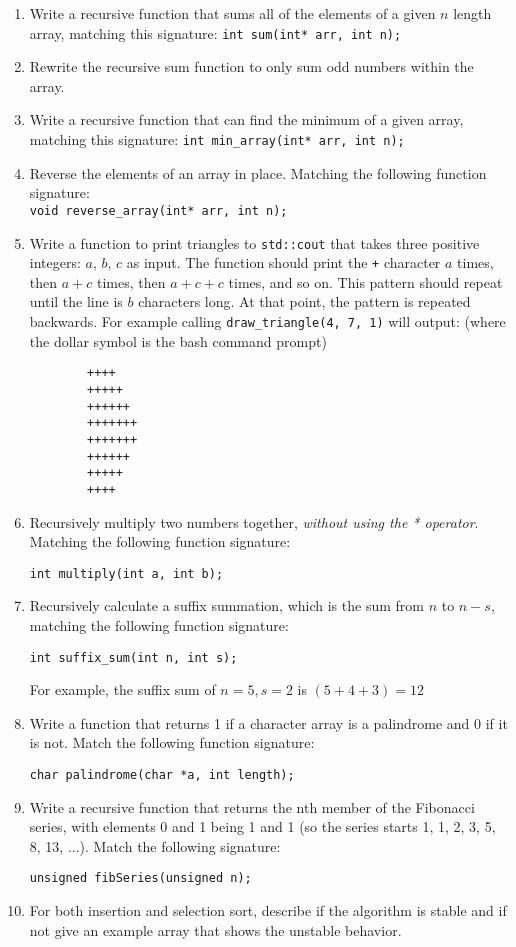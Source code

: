\documentclass[11pt]{article}
\begin{document}
    \begin{enumerate}
        \item Write a recursive function that sums all of the elements of a given $n$ length array, matching this signature: \verb|int sum(int* arr, int n);|
        \item Rewrite the recursive sum function to only sum odd numbers within the array.
        \item Write a recursive function that can find the minimum of a given array, matching this signature:
        \verb|int min_array(int* arr, int n);|
        \item Reverse the elements of an array in place. Matching the following function signature:\\
        \verb|void reverse_array(int* arr, int n);|
    \item Write a function to print triangles to \verb|std::cout| that takes three positive integers: $a$, $b$, $c$ as input. The function should print the \verb|+| character $a$ times, then $a+c$ times, then $a+c+c$ times, and so on. This pattern should repeat until the line is $b$ characters long. At that point, the pattern is repeated backwards. For example calling \verb|draw_triangle(4, 7, 1)| will output: (where the dollar symbol is the bash command prompt)
    \begin{verbatim}
        ++++
        +++++
        ++++++
        +++++++
        +++++++
        ++++++
        +++++
        ++++
    \end{verbatim} 

    \item Recursively multiply two numbers together, \emph{without using the * operator}. Matching the following function signature:

        \verb|int multiply(int a, int b);|
        
    \item Recursively calculate a suffix summation, which is the sum from $n$ to $n-s$, matching the following function signature:

        \verb|int suffix_sum(int n, int s);| 

    For example, the suffix sum of $n=5, s=2$ is $(5+4+3) = 12$
    \item Write a function that returns 1 if a character array is a palindrome and 0 if it is not. Match the following function signature:
    
        \verb|char palindrome(char *a, int length);|
        
    \item Write a recursive function that returns the nth member of the Fibonacci series, with elements 0 and 1 being 1 and 1 (so the series starts 1, 1, 2, 3, 5, 8, 13, ...). Match the following signature:
    
        \verb|unsigned fibSeries(unsigned n);|
    \item For both insertion and selection sort, describe if the algorithm is stable and if not give an example array that shows the unstable behavior.
    \end{enumerate}
    
    \label{r:lastpage}
    
    
\end{document}
